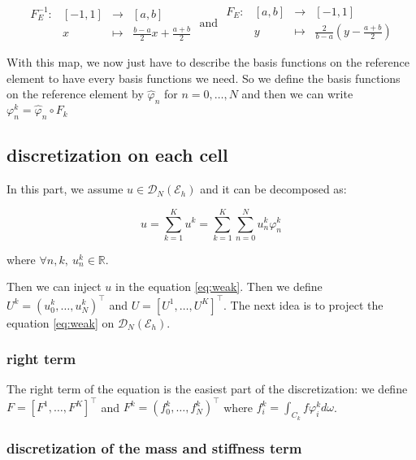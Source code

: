 \documentclass[a4paper,10pt,draft]{article}
\begin{document}
\begin{equation*}
\begin{array}{cccc}
 F_E^{-1} : & [-1,1] & \longrightarrow & [a,b] \\
            & x & \longmapsto & \frac{b-a}{2} x + \frac{a+b}{2}
\end{array}
\text{ and }
\begin{array}{cccc}
 F_E : & [a,b] & \longrightarrow & [-1,1] \\
            & y & \longmapsto & \frac{2}{b-a} \left(y - \frac{a+b}{2}\right)
\end{array}
\end{equation*}

 With this map, we now just have to describe the basis functions on the reference element to have 
every basis functions we need. So we define the basis functions on the reference element by $\hat 
\varphi_n$ for $n= 0, \dots , N$ and then we can write $\varphi_n^k = \hat 
\varphi_n \circ F_k$

\subsection{discretization on each cell}

In this part, we assume $u \in \mathcal{D}_N(\mathcal{E}_h)$ and it can be decomposed as:

$$
u = \sum_{k=1}^K u^k = \sum_{k=1}^K \sum_{n=0}^N u_n^k \varphi_n^k
$$

where $\forall n,k,\ u_n^k \in \mathbb{R}$.


Then we can inject $u$ in the equation \ref{eq:weak}. Then we define $U^k = 
(u_0^k, \dots , u_N^k)^\top$ and $U = [U^1, \dots , U^K]^\top$. The next idea is to project the 
equation \ref{eq:weak} on $\mathcal{D}_N(\mathcal{E}_h)$.

\subsubsection{right term}

The right term of the equation is the easiest part of the discretization: we define $F = [F^1, 
\dots , F^K]^\top$ and $F^k = 
(f_0^k, \dots , f_N^k)^\top$ where $f_i^k = \int_{C_k} f \varphi_i^k d\omega$.



\subsubsection{discretization of the mass and stiffness term}
\end{document}
